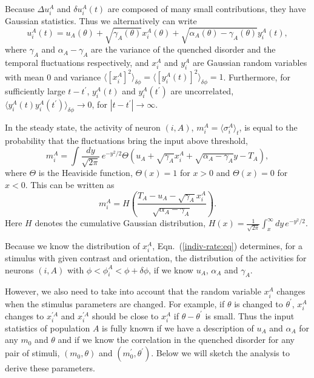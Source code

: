 Because $\Delta u_i^A$ and $\delta u_i^{A}(t)$ are composed of many small
contributions, they have Gaussian statistics.
Thus we alternatively can write
\begin{equation}
u_i^A(t)=u_{A}(\theta)+\sqrt{\gamma_A(\theta)}x_i^A(\theta)+
\sqrt{\alpha_A(\theta)-\gamma_A(\theta)}y_i^A(t),
\label{input_terms1:eq}
\end{equation}
where $\gamma_A$ and $\alpha_A-\gamma_A$ are the variance of the quenched disorder
and the temporal fluctuations respectively, and $x_i^A$ and $y_i^A$ are 
Gaussian random variables with mean 0 and variance $\langle [x_i^A]^2\rangle_{\delta \phi}=
\langle [y_i^A(t)]^2\rangle_{\delta \phi}=1$\@. Furthermore, for sufficiently large 
$t-t^\prime$, $y_i^A(t)$ and $y_i^A(t^\prime)$ are uncorrelated,
$\langle y_i^A(t)y_i^A(t^\prime)\rangle_{\delta \phi}\rightarrow 0$, for
$|t-t^\prime|\rightarrow\infty$\@.

In the steady state, the activity of neuron $(i,A)$, $m_i^A=
\langle \sigma_i^A\rangle_t$, is equal to the probability that the
fluctuations bring the input above threshold,
\begin{equation}
m_i^A=\int\!\frac{dy}{\sqrt{2\pi}}\,e^{-y^2/2}
\Theta \left(u_A+\sqrt{\gamma_A}x_i^A+\sqrt{\alpha_A-\gamma_A}y-T_A\right),
\end{equation}
where $\Theta$ is the Heaviside function, $\Theta(x)=1$ for $x>0$ and
$\Theta(x)=0$ for $x<0$\@. This can be written as
\begin{equation}
m_i^A=H\left(\frac{T_A-u_A-\sqrt{\gamma_A}x_i^A}{ \sqrt{\alpha_A-\gamma_A}}
\right).
\label{indiv-rate:eq}
\end{equation}
Here $H$ denotes the cumulative Gaussian distribution,
$H(x)=\frac{1}{\sqrt{2\pi}}\int_x^\infty\!dy\,e^{-y^2/2}$\@.

Because we know the distribution of $x_i^A$, Eqn.~(\ref{indiv-rate:eq}) 
determines, for a stimulus with given contrast and orientation, the distribution 
of the activities for neurons $(i,A)$ with $\phi<\phi_i^A<\phi+\delta\phi$, 
if we know $u_A$, $\alpha_A$ and $\gamma_A$\@. 

However, we also need to take into account that the random variable $x_i^A$
changes when the stimulus parameters are changed. For example, if
$\theta$ is changed to $\theta^\prime$, $x_i^A$ changes to
$x_i^{\prime A}$ and $x_i^{\prime A}$ should be close to
$x_i^A$ if $\theta-\theta^\prime$ is small. Thus the input statistics of population $A$ is fully known if we have a
description of $u_A$ and $\alpha_A$ for any $m_0$ and $\theta$ and if we know the
correlation in the quenched disorder for any pair of stimuli,
$(m_0,\theta)$ and $(m_0^\prime,\theta^\prime)$.  Below we will sketch
the analysis to derive these parameters.

